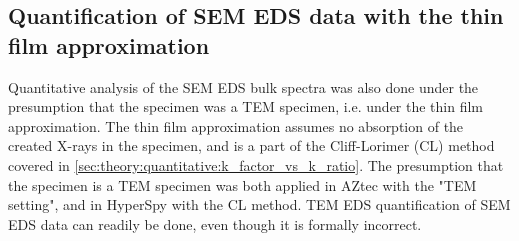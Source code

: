 





\subsection{Quantification of SEM EDS data with the thin film approximation}
\label{sec:results:quantification_cliff_lorimer}


Quantitative analysis of the SEM EDS bulk spectra was also done under the presumption that the specimen was a TEM specimen, i.e. under the thin film approximation.
The thin film approximation assumes no absorption of the created X-rays in the specimen, and is a part of the Cliff-Lorimer (CL) method covered in \cref{sec:theory:quantitative:k_factor_vs_k_ratio}.
The presumption that the specimen is a TEM specimen was both applied in AZtec with the "TEM setting", and in HyperSpy with the CL method.
TEM EDS quantification of SEM EDS data can readily be done, even though it is formally incorrect.

